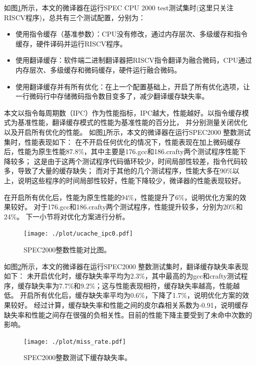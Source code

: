 如图\ref{img:ipc}所示，本文的微译器在运行SPEC CPU 2000 test测试集时(这里只关注RISCV程序)，总共有三个测试配置，分别为：
\begin{itemize}
  \item 使用指令缓存（基准参数）：CPU没有修改，通过内存层次、多级缓存和指令缓存，硬件译码并运行RISCV程序。
  \item 使用翻译缓存：软件端二进制翻译器把RISCV指令翻译为融合微码，CPU通过内存层次、多级缓存和微码缓存，硬件运行融合微码。
  \item 使用翻译缓存并有所有优化：在上一个配置基础上，开启了所有优化选项，让一行微码行中存储微码指令数目变多了，减少翻译缓存缺失率。
\end{itemize}

本文以指令每周期数（IPC）作为性能指标，IPC越大，性能越好。以指令缓存模式为基准性能，翻译缓存模式的性能为基准性能的百分比，
并分别测量关闭优化以及开启所有优化的性能。
如图\ref{img:ipc}所示，本文的微译器在运行SPEC2000 整数测试集时，性能表现如下：
在不开启任何优化的情况下，性能表现在加上微码缓存后，性能为原生性能87.8\%，其中主要是176.gcc和186.crafty两个测试程序性能下降较多；
这是由于这两个测试程序代码循环较少，时间局部性较差，指令代码较多，导致了大量的缓存缺失；
而对于其他的几个测试程序，性能大多在90\%以上，说明这些程序的时间局部性较好，性能下降较少，微译器的性能表现较好。

在开启所有优化后，性能为原生性能的94\%，性能提升了6\%，说明优化方案的效果较好。
对于176.gcc和186.crafty两个测试程序，性能提升较多，分别为20\%和24\%。
下一小节将对优化方案进行分析。


\begin{figure}[!htbp]
  \centering
  \texttt{[image: ./plot/ucache\_ipc0.pdf]}
  \caption{SPEC2000整数性能对比图。}
  \label{img:ipc}
\end{figure}

如图\ref{img:miss_rate}所示，本文的微译器在运行SPEC2000 整数测试集时，翻译缓存缺失率表现如下：
未开启优化时，缓存缺失率平均为2.3\%，其中最高的为gcc和crafty测试程序，缓存缺失率为7.7\%和9.2\%；这与性能表现相符，缓存缺失率越高，性能越低。
开启所有优化后，缓存缺失率平均为0.6\%，下降了1.7\%，说明优化方案的效果较好。
经过计算，缓存缺失率和性能之间的皮尔森相关系数为-0.91，说明缓存缺失率和性能之间存在很强的负相关性。目前的性能下降主要受到了未命中次数的影响。

\begin{figure}[!htbp]
  \centering
  \texttt{[image: ./plot/miss\_rate.pdf]}
  \caption{SPEC2000整数测试下缓存缺失率。}
  \label{img:miss_rate}
\end{figure}

